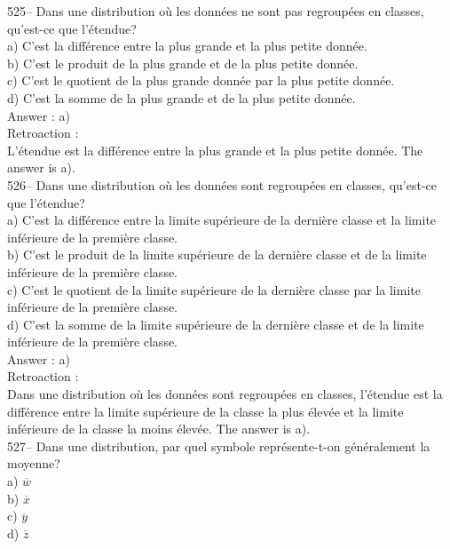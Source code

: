 ﻿\documentclass[letterpaper, 12pt]{article}
\begin{document}
525-- Dans une distribution o\`u les donn\'ees ne sont pas regroup\'ees en
classes, qu'est-ce que l'\'etendue?\\
a) C'est la diff\'erence entre la plus grande et la plus petite donn\'ee.\\
b) C'est le produit de la plus grande et de la plus petite donn\'ee.\\
c) C'est le quotient de la plus grande donn\'ee par la plus petite
donn\'ee.\\
d) C'est la somme de la plus grande et de la plus petite donn\'ee.\\

Answer : a)\\

Retroaction : \\
L'\'etendue est la diff\'erence entre la plus grande et la plus petite
donn\'ee.  The answer is a).\\

526-- Dans une distribution o\`u les donn\'ees sont regroup\'ees en classes,
qu'est-ce que l'\'etendue?\\
a) C'est la diff\'erence entre la limite sup\'erieure de la derni\`ere
classe et la limite inf\'erieure de la premi\`ere classe.\\
b) C'est le produit de la limite sup\'erieure de la derni\`ere classe et de
la limite inf\'erieure de la premi\`ere classe.\\
c) C'est le quotient de la limite sup\'erieure de la derni\`ere classe par
la limite inf\'erieure de la premi\`ere classe.\\
d) C'est la somme de la limite sup\'erieure de la derni\`ere classe et de la
limite inf\'erieure de la premi\`ere classe.\\

Answer : a) \\

Retroaction : \\
Dans une distribution o\`u les donn\'ees sont regroup\'ees en classes,
l'\'etendue est la diff\'erence entre la limite sup\'erieure de la classe la
plus \'elev\'ee et la limite inf\'erieure de la classe la moins \'elev\'ee.
The answer is a).\\

527-- Dans une distribution, par quel symbole repr\'esente-t-on
g\'en\'eralement la moyenne?\\
a) $\overline{w}$\\
b) $\overline{x}$\\
c) $\overline{y}$\\
d) $\overline{z}$\\
\end{document}

